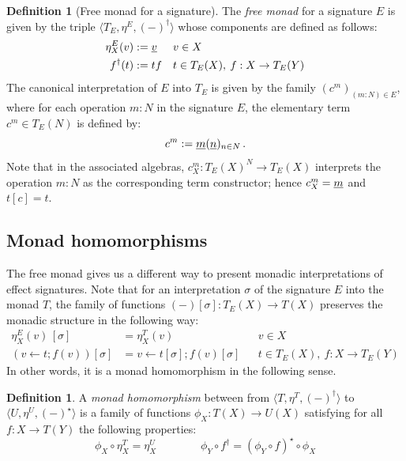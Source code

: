 \documentclass[11pt,oneside]{book}
\theoremstyle{definition}
\newtheorem{definition}[theorem]{Definition}
\newcommand{\ul}[1]{%
  \underline{\smash{#1}}
}
\begin{document}
\begin{definition}[Free monad for a signature]
The \emph{free monad} for a signature $E$
is given by the triple $\langle T_E, \eta^E, (-)^\dagger \rangle$
whose components are defined as follows:
\begin{align*}
  \eta^E_X(v) &:= \ul{v} && v \in X
  \\
  f^\dagger(t) &:= t f &&
    t \in T_E(X), \:
    f : X \rightarrow T_E(Y)
\end{align*}
The canonical interpretation of $E$ into $T_E$
is given by the family $(c^m)_{(m \mathbin: N) \in E}$,
where for each operation $m \mathbin: N$
in the signature $E$,
the elementary term $c^m \in T_E(N)$
is defined by:
\[
  c^m := \ul{m}(\ul{n})_{n \in N}
  \,.
\]
Note that in the associated algebras,
$c^m_X : T_E(X)^N \rightarrow T_E(X)$
interprets the operation $m \mathbin: N$
as the corresponding term constructor;
hence $c^m_X = \ul{m}$ and $t[c] = t$.
\end{definition}


\subsection{Monad homomorphisms} \label{sec:eff:monhom} %

The free monad gives us a different way to present
monadic interpretations of effect signatures.
Note that for
an interpretation $\sigma$ of the signature $E$ into the monad $T$,
the family of functions
$(-)[\sigma] : T_E(X) \rightarrow T(X)$
preserves the monadic structure in the following way:
\begin{align*}
  \eta^E_X(v) \, [\sigma] &= \eta^T_X(v)
    && v \in X
  \\
  (v \mathbin\leftarrow t \mathbin; f(v))[\sigma] &=
  v \mathbin\leftarrow t[\sigma] \mathbin; f(v)[\sigma]
    && t \in T_E(X), \: f : X \rightarrow T_E(Y)
\end{align*}
In other words,
it is a monad homomorphism in the following sense.

\begin{definition} \label{def:setmonhom}
A \emph{monad homomorphism} between
from $\langle T, \eta^T, (-)^\dagger \rangle$
to $\langle U, \eta^U, (-)^\star \rangle$
is a family of functions
$\phi_X : T(X) \rightarrow U(X)$
satisfying
for all $f : X \rightarrow T(Y)$
the following properties:
\[
  \phi_X \circ \eta^T_X = \eta^U_X
  \qquad \qquad
  \phi_Y \circ f^\dagger = (\phi_Y \circ f)^\star \circ \phi_X
\]
\end{definition}
\end{document}
